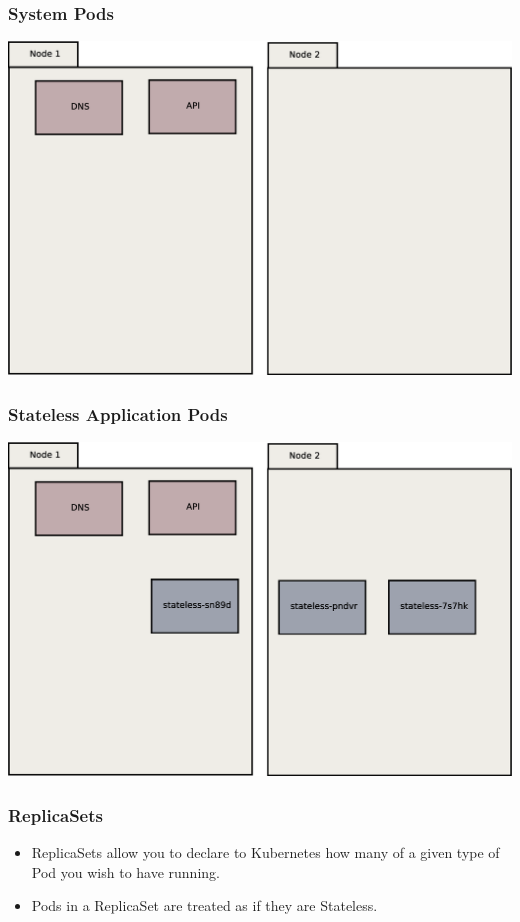 \documentclass{beamer}
\begin{document}
\begin{frame}
    \frametitle{System Pods}
    \includegraphics[width=\textwidth,height=\textheight,keepaspectratio]{graphics/01-systemPods.eps}
\end{frame}

\begin{frame}
    \frametitle{Stateless Application Pods}
    \includegraphics[width=\textwidth,height=\textheight,keepaspectratio]{graphics/02-statelessAppPods.eps}
\end{frame}

\begin{frame}
\frametitle{ReplicaSets}
\begin{itemize}    
    \item ReplicaSets allow you to declare to Kubernetes how many of a given type of Pod you wish to have running.
    \item Pods in a ReplicaSet are treated as if they are Stateless.
\end{itemize}
\end{frame}
\end{document}
